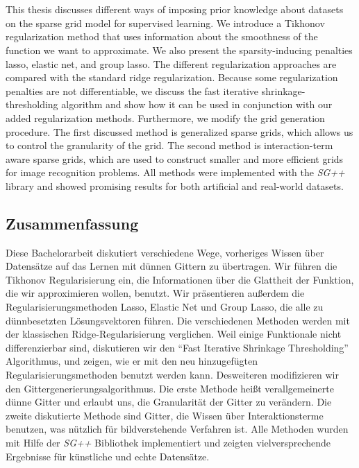 \chapter{\abstractname}
This thesis discusses different ways of imposing prior knowledge about datasets on the sparse grid model for supervised learning.
We introduce a Tikhonov regularization method that uses information about the smoothness of the function we want to approximate.
We also present the sparsity-inducing penalties lasso, elastic net, and group lasso.
The different regularization approaches are compared with the standard ridge regularization.
Because some regularization penalties are not differentiable, we discuss the fast iterative shrinkage-thresholding algorithm and show how it can be used in conjunction with our added regularization methods.
Furthermore, we modify the grid generation procedure.
The first discussed method is generalized sparse grids, which allows us to control the granularity of the grid.
The second method is interaction-term aware sparse grids, which are used to construct smaller and more efficient grids for image recognition problems.
All methods were implemented with the \emph{SG++} library and showed promising results for both artificial and real-world datasets.

\section*{Zusammenfassung}
Diese Bachelorarbeit diskutiert verschiedene Wege, vorheriges Wissen über
Datensätze auf das Lernen mit dünnen Gittern zu übertragen.
Wir führen die Tikhonov Regularisierung ein, die Informationen über die
Glattheit der Funktion, die wir approximieren wollen, benutzt.
Wir präsentieren außerdem die Regularisierungsmethoden Lasso, Elastic Net und
Group Lasso, die alle zu dünnbesetzten Lösungsvektoren führen.
Die verschiedenen Methoden werden mit der klassischen Ridge-Regularisierung
verglichen.
Weil einige Funktionale nicht differenzierbar sind, diskutieren wir den ``Fast
Iterative Shrinkage Thresholding'' Algorithmus, und zeigen, wie er mit den neu
hinzugefügten Regularisierungsmethoden benutzt werden kann.
Desweiteren modifizieren wir den Gittergenerierungsalgorithmus.
Die erste Methode heißt verallgemeinerte dünne Gitter und erlaubt uns, die
Granularität der Gitter zu verändern.
Die zweite diskutierte Methode sind Gitter, die Wissen über Interaktionsterme
benutzen, was nützlich für bildverstehende Verfahren ist.
Alle Methoden wurden mit Hilfe der \emph{SG++} Bibliothek implementiert und zeigten
vielversprechende Ergebnisse für künstliche und echte Datensätze.
